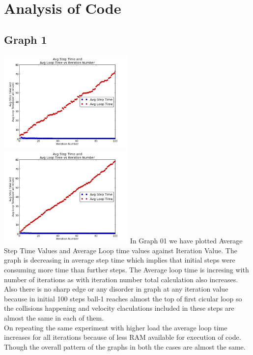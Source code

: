 \documentclass[11pt]{article}
\begin{document}
\section{Analysis of Code}
\subsection{Graph 1}
 \includegraphics[width=0.5\textwidth,keepaspectratio]{img/g08_plot01_low} \includegraphics[width=0.5\textwidth,keepaspectratio]{img/g08_plot01_high}
In Graph 01 we have plotted Average Step Time Values and Average Loop time values against Iteration Value. The graph is decreasing in average step time which implies that initial steps were consuming more time than further steps.  The Average loop time is incresing with number of iterations as with iteration number total calculation also increases. Also there is no sharp edge or any disorder in graph at any iteration value because in initial 100 steps ball-1 reaches almost the top of first cicular loop so the collisions happening and velocity claculations included in these steps are almost the same in each of them.\\
On repeating the same experiment with higher load the average loop time increases for all iterations because of less RAM available for execution of code. Though the overall pattern of the graphs in both the cases are almost the same.\\
\end{document}

